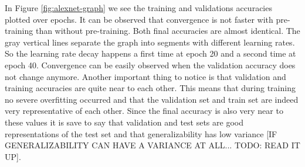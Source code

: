 \begin{table}[h] \centering
{}
\caption{Hyper parameters for Alexnet optimized with SigOpt and without pre-training}
\label{tbl:AlexNetBaseline}
\end{table}

\begin{table}[h] \centering
{}
\caption{Hyper parameters for Alexnet optimized with SigOpt and without pre-training}
\label{tbl:AlexNetMultiRun}
\end{table}

In Figure \ref{fig:alexnet-graph} we see the training and validations accuracies plotted over epochs. It can be observed that convergence is not faster with pre-training than without pre-training. Both final accuracies are almost identical. The gray vertical lines separate the graph into segments with different learning rates. So the learning rate decay happens a first time at epoch 20 and a second time at epoch 40. Convergence can be easily observed when the validation accuracy does not change anymore. Another important thing to notice is that validation and training accuracies are quite near to each other. This means that during training no severe overfitting occurred and that the validation set and train set are indeed very representative of each other. Since the final accuracy is also very near to these values it is save to say that validation and test sets are good representations of the test set and that generalizability has low variance [IF GENERALIZABILITY CAN HAVE A VARIANCE AT ALL... TODO: READ IT UP].

